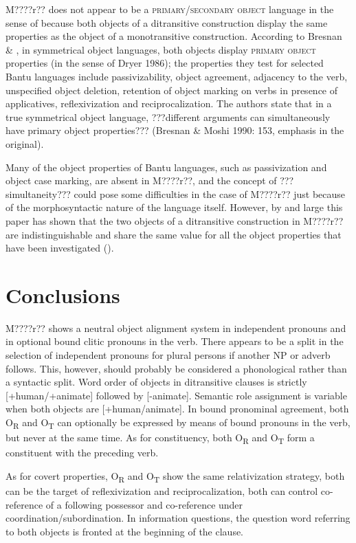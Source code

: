 \documentclass[output=paper]{langsci/langscibook}
\begin{document}
M????r?? does not appear to be a \textsc{primary}/\textsc{secondary object }language in the sense of \citet{Dryer1986} because both objects of a ditransitive construction display the same properties as the object of a monotransitive construction.{ }According to Bresnan \& \citet[147]{Moshi1991}, in symmetrical object languages, both objects display \textsc{primary object} properties (in the sense of Dryer 1986); the properties they test for selected Bantu languages include passivizability, object agreement, adjacency to the verb, unspecified object deletion, retention of object marking on verbs in presence of applicatives, reflexivization and reciprocalization. The authors state that in a true symmetrical object language, ???different arguments can simultaneously have primary object properties??? (Bresnan \& Moshi 1990: 153, emphasis in the original).

Many of the object properties of Bantu languages, such as passivization and object case marking, are absent in M????r??, and the concept of ???simultaneity??? could pose some difficulties in the case of M????r?? just because of the morphosyntactic nature of the language itself. However, by and large this paper has shown that the two objects of a ditransitive construction in M????r?? are indistinguishable and share the same value for all the object properties that have been investigated ().  

\section{Conclusions}

M????r?? shows a neutral object alignment system in independent pronouns and in optional bound clitic pronouns in the verb. There appears to be a split in the selection of independent pronouns for plural persons if another NP or adverb follows. This, however, should probably be considered a phonological rather than a syntactic split. Word order of objects in ditransitive clauses is strictly [+human/+animate] followed by [-animate]. Semantic role assignment is variable when both objects are [+human/animate]. In bound pronominal agreement, both O\textsubscript{R} and O\textsubscript{T} can optionally be expressed by means of bound pronouns in the verb, but never at the same time. As for constituency, both O\textsubscript{R} and O\textsubscript{T} form a constituent with the preceding verb. 

As for covert properties, O\textsubscript{R} and O\textsubscript{T} show the same relativization strategy, both can be the target of reflexivization and reciprocalization, both can control co-reference of a following possessor and co-reference under coordination/subordination. In information questions, the question word referring to both objects is fronted at the beginning of the clause. 
\end{document}
